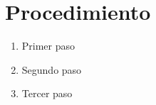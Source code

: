 \section{Procedimiento}
\label{apend:Procedimiento}


\begin{enumerate}
	\item Primer paso
    \item Segundo paso
    \item Tercer paso
\end{enumerate}